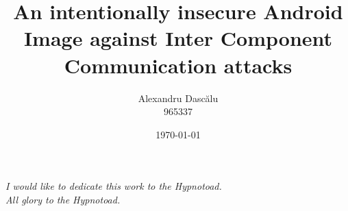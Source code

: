 \documentclass[11pt, a4paper, oneside, openright]{custard}
\begin{document}
	
	\title{An intentionally insecure Android Image against Inter Component Communication attacks}
	\author{Alexandru Dascălu\protect\\{\normalsize 965337}}
	
	
	
	\date{\today}
	
	\frontmatter%
	\maketitle
	\declaration
	\cleardoublepage
	
	\begin{vplace}[0.7]
		\begin{large}
			\begin{center}
				\textit{I would like to dedicate this work to the Hypnotoad.\\All glory to the Hypnotoad.}
			\end{center}
		\end{large}
	\end{vplace}
\end{document}
